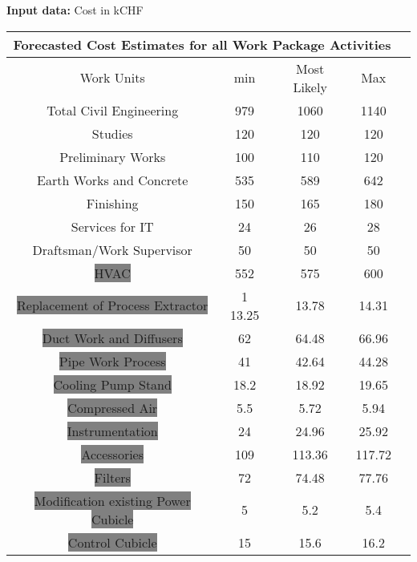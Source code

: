 \textbf{Input data:} Cost in kCHF

\begin{table}[ht]
	
\begin{center}
	\begin{tabular}{ |c|c|c|c|c|} 
		\hline
		\multicolumn{4}{|c|}{Forecasted Cost Estimates for all Work Package Activities} \\
		\hline
		Work Units 										& min & Most  Likely&Max\\
		\hline
		\colorbox{Melon}{Total Civil Engineering}	&979   						& 		1060			& 1140\\ 
		\hline
		\colorbox{Melon}{Studies}							&120						& 	120				&120\\ 
		\hline
		\colorbox{Melon}{Preliminary Works}					&100						& 		110			&120\\ 
		\hline
		\colorbox{Melon}{Earth Works and Concrete}		&535 							& 		589			& 642\\
		\hline
		\colorbox{Melon}{Finishing}						&		150					& 		165		&180\\ 
		\hline
		\colorbox{Melon}{Services for IT}				&24   							& 	26				&28\\
		\hline
		\colorbox{Melon}{Draftsman/Work Supervisor}		&50   							& 	50				&50\\
		\hline
		\colorbox{Gray}{HVAC}								&552   							& 		575			& 600\\
		\hline
		\colorbox{Gray}{Replacement of Process Extractor}	&1   13.25		& 		13.78			&14.31\\
		\hline
		\colorbox{Gray}{Duct Work and Diffusers}		&62 		& 		64.48			&66.96\\
		\hline
		\colorbox{Gray}{Pipe Work Process}		&41   							& 			42.64		&44.28\\
		\hline
		\colorbox{Gray}{Cooling Pump Stand}	&18.2   			& 		18.92			&19.65\\
		\hline
		\colorbox{Gray}{Compressed Air}			&5.5   							& 	5.72				&5.94\\
		\hline
		\colorbox{Gray}{Instrumentation}		&24   							& 	24.96				&25.92\\
		\hline
		\colorbox{Gray}{Accessories}			&109   							& 113.36			&117.72\\
		\hline
		\colorbox{Gray}{Filters}			&72  							& 	74.48				&77.76\\
		\hline
		\colorbox{Gray}{Modification existing Power Cubicle}	&5   							& 		5.2			&5.4\\
		\hline
		\colorbox{Gray}{Control Cubicle}		&15   							& 		15.6			&16.2\\

\end{tabular}
\end{center}
\end{table}
